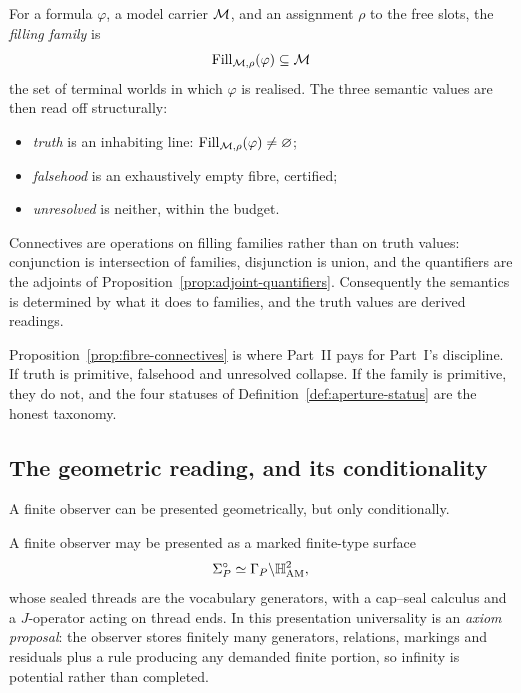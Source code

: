 \begin{definition}\label{def:filling-fibre}
For a formula $\varphi$, a model carrier $\mathcal M$, and an assignment $\rho$ to the free
slots, the \emph{filling family} is
\[
  \operatorname{Fill}_{\mathcal M,\rho}(\varphi)\subseteq\mathcal M
\]
the set of terminal worlds in which $\varphi$ is realised.  The three semantic values are
then read off structurally:
\begin{itemize}
\item \emph{truth} is an inhabiting line: $\operatorname{Fill}_{\mathcal M,\rho}(\varphi)\neq\varnothing$;
\item \emph{falsehood} is an exhaustively empty fibre, certified;
\item \emph{unresolved} is neither, within the budget.
\end{itemize}
\end{definition}

\begin{proposal}\label{prop:fibre-connectives}
Connectives are operations on filling families rather than on truth values:
conjunction is intersection of families, disjunction is union, and the quantifiers are
the adjoints of Proposition~\ref{prop:adjoint-quantifiers}.  Consequently the semantics is
determined by what it does to families, and the truth values are derived readings.
\end{proposal}

\begin{remark}
Proposition~\ref{prop:fibre-connectives} is where Part~II pays for Part~I's discipline.  If
truth is primitive, falsehood and unresolved collapse.  If the family is primitive, they
do not, and the four statuses of Definition~\ref{def:aperture-status} are the honest
taxonomy.
\end{remark}

\subsection{The geometric reading, and its conditionality}

A finite observer can be presented geometrically, but only conditionally.

\begin{proposal}\label{prop:surface-observer}
A finite observer may be presented as a marked finite-type surface
\[
  \Sigma^{\circ}_{P}\simeq \Gamma_{P}\backslash\mathbb{H}^{2}_{\mathrm{AM}} ,
\]
whose sealed threads are the vocabulary generators, with a cap--seal calculus and a
$J$-operator acting on thread ends.  In this presentation universality is an
\emph{axiom proposal}: the observer stores finitely many generators, relations, markings
and residuals plus a rule producing any demanded finite portion, so infinity is potential
rather than completed.
\end{proposal}


